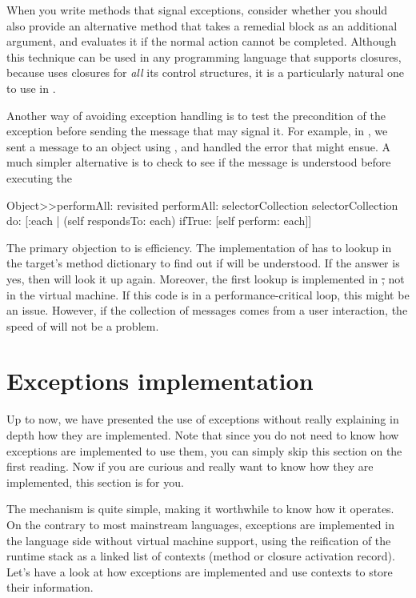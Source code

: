 When you write methods that signal exceptions, consider whether you should also provide an alternative method that takes a remedial block as an additional argument, and evaluates it if the normal action cannot be completed.  
Although this technique can be used in any programming language that supports closures, because \st{} uses closures for \emph{all} its control structures, it is a particularly natural one to use in \st{}.

Another way of avoiding exception handling is to test the precondition of the exception before sending the message that may signal it.  For example, in , we sent a message to an object using , and handled the  error that might ensue.  A much simpler alternative is to check to see if the message is understood before executing the 

\begin{method}[simplerObjectPerfromAll]{Object>>performAll: revisited}
performAll: selectorCollection
	selectorCollection
		do: [:each | (self respondsTo: each)
				ifTrue: [self perform: each]]
\end{method}

The primary objection to  is efficiency.  The implementation of  has to lookup  in the target's method dictionary  to find out if  will be understood.  If the answer is yes, then  will look it up again.  Moreover, the first lookup is implemented in \st, not in the virtual machine.  If this code is in a performance-critical loop, this might be an issue.  However, if the collection of messages comes from a user interaction, the speed of  will not be a problem.


\section{Exceptions implementation}
Up to now, we have presented the use of exceptions without really explaining in depth how they are implemented. Note that since you do not need to know how exceptions are implemented to use them, you can simply skip this section on the first reading. Now if you are curious and really want to know how they are implemented, this section is for you. 

The mechanism is quite simple, making it worthwhile to know how it operates. On the contrary to most mainstream languages, exceptions are implemented in the language side without virtual machine support, using the reification of the runtime stack as a linked list of contexts (method or closure activation record). Let's have a look at how exceptions are implemented and use contexts to store their information.

